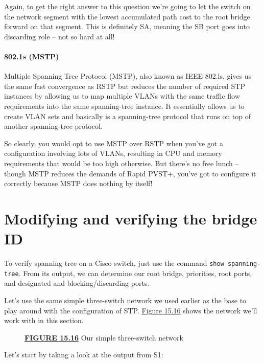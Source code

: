Again, to get the right answer to this question we're going to let the
switch on the network segment with the lowest accumulated path cost to
the root bridge forward on that segment. This is definitely SA, meaning
the SB port goes into discarding role -- not so hard at all!

\paragraph[802.1s
(MSTP)]{\texorpdfstring{802.1s
(MSTP)}{802.1s (MSTP)}}

Multiple Spanning Tree Protocol (MSTP), also known as IEEE 802.ls, gives
us the same fast convergence as RSTP but reduces the number of required
STP instances by allowing us to map multiple VLANs with the same traffic
flow requirements into the same spanning-tree instance. It essentially
allows us to create VLAN sets and basically is a spanning-tree protocol
that runs on top of another spanning-tree protocol.

So clearly, you would opt to use MSTP over RSTP when you've got a
configuration involving lots of VLANs, resulting in CPU and memory
requirements that would be too high otherwise. But there's no free
lunch -- though MSTP reduces the demands of Rapid PVST+, you've got to
configure it correctly because MSTP does nothing by itself!

\section{Modifying and verifying the bridge ID}

To verify spanning tree on a Cisco switch, just use the command
\texttt{show\ spanning-tree}. From its output, we can determine our root
bridge, priorities, root ports, and designated and blocking/discarding
ports.

Let's use the same simple three-switch network we used earlier as the
base to play around with the configuration of STP.
\protect\hyperlink{c15.xhtmlux5cux23figure15-16}{Figure 15.16} shows the
network we'll work with in this section.

\begin{figure}
\centering
\caption{{\protect\hyperlink{c15.xhtmlux5cux23figureanchor15-16}{\textbf{FIGURE
15.16}} Our simple three-switch network}}
\end{figure}

Let's start by taking a look at the output from S1:

